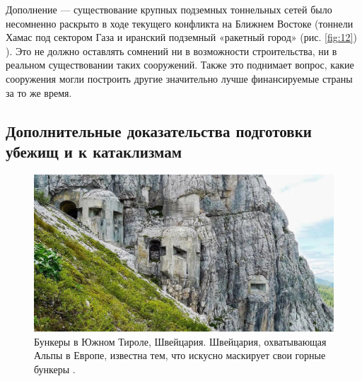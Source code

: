\documentclass[10pt,twocolumn,letterpaper]{article}
\begin{document}
Дополнение — существование крупных подземных тоннельных сетей было несомненно раскрыто в ходе текущего конфликта на Ближнем Востоке (тоннели Хамас под сектором Газа \cite{38} и иранский подземный «ракетный город» (рис. \ref{fig:12}) \cite{39,40}). Это не должно оставлять сомнений ни в возможности строительства, ни в реальном существовании таких сооружений. Также это поднимает вопрос, какие сооружения могли построить другие значительно лучше финансируемые страны за то же время.

\subsection{Дополнительные доказательства подготовки убежищ и к катаклизмам}

\begin{figure}[t]
\begin{center}
   \includegraphics[width=1\linewidth]{tyrol.jpg}
\end{center}
   \caption{Бункеры в Южном Тироле, Швейцария. Швейцария, охватывающая Альпы в Европе, известна тем, что искусно маскирует свои горные бункеры \cite{32}.}
\label{fig:7}
\label{fig:onecol}
\end{figure}
\end{document}
